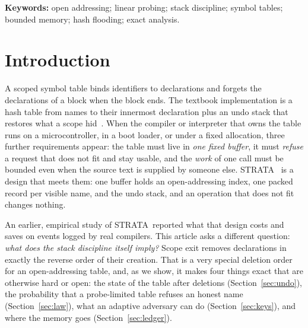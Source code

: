 \documentclass[11pt,a4paper]{article}
\theoremstyle{definition}
\theoremstyle{remark}
\newcommand{\st}{STRATA}
\begin{document}
\noindent\textbf{Keywords:} open addressing; linear probing; stack discipline; symbol tables; bounded memory; hash flooding; exact analysis.

\section{Introduction}\label{sec:intro}

A scoped symbol table binds identifiers to declarations and forgets the declarations of a block when the block ends. The textbook implementation is a hash table from names to their innermost declaration plus an undo stack that restores what a scope hid~\cite{appel1998,graham1979}. When the compiler or interpreter that owns the table runs on a microcontroller, in a boot loader, or under a fixed allocation, three further requirements appear: the table must live in \emph{one fixed buffer}, it must \emph{refuse} a request that does not fit and stay usable, and the \emph{work} of one call must be bounded even when the source text is supplied by someone else. \st~\cite{strata} is a design that meets them: one buffer holds an open-addressing index, one packed record per visible name, and the undo stack, and an operation that does not fit changes nothing.

An earlier, empirical study of \st\ reported what that design costs and saves on events logged by real compilers. This article asks a different question: \emph{what does the stack discipline itself imply?} Scope exit removes declarations in exactly the reverse order of their creation. That is a very special deletion order for an open-addressing table, and, as we show, it makes four things exact that are otherwise hard or open: the state of the table after deletions (Section~\ref{sec:undo}), the probability that a probe-limited table refuses an honest name (Section~\ref{sec:law}), what an adaptive adversary can do (Section~\ref{sec:keys}), and where the memory goes (Section~\ref{sec:ledger}).
\end{document}
